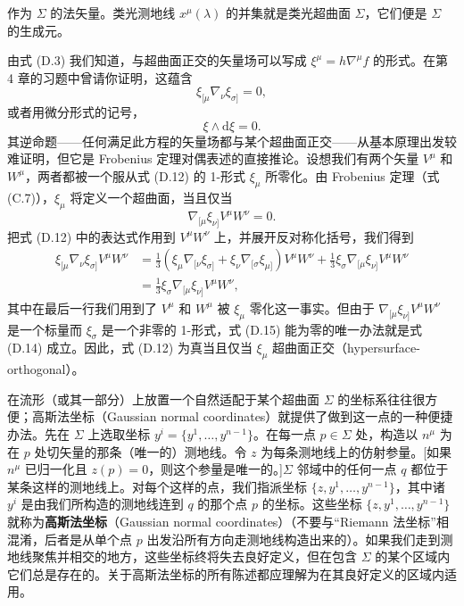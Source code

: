 作为 $\Sigma$ 的法矢量。类光测地线 $x^\mu(\lambda)$ 的并集就是类光超曲面 $\Sigma$，它们便是 $\Sigma$ 的生成元。

由式 (D.3) 我们知道，与超曲面正交的矢量场可以写成 $\xi^\mu = h \nabla^\mu f$ 的形式。在第 4 章的习题中曾请你证明，这蕴含
\begin{equation*}
\xi_{[\mu} \nabla_\nu \xi_{\sigma]} = 0,
\tag{D.12}
\end{equation*}
或者用微分形式的记号，
\begin{equation*}
\xi \wedge \mathrm{d}\xi = 0.
\tag{D.13}
\end{equation*}
其逆命题——任何满足此方程的矢量场都与某个超曲面正交——从基本原理出发较难证明，但它是 Frobenius 定理对偶表述的直接推论。设想我们有两个矢量 $V^\mu$ 和 $W^\mu$，两者都被一个服从式 (D.12) 的 1-形式 $\xi_\mu$ 所零化。由 Frobenius 定理（式 (C.7)），$\xi_\mu$ 将定义一个超曲面，当且仅当
\begin{equation*}
\nabla_{[\mu} \xi_{\nu]} V^\mu W^\nu = 0.
\tag{D.14}
\end{equation*}
把式 (D.12) 中的表达式作用到 $V^\mu W^\nu$ 上，并展开反对称化括号，我们得到
\begin{align*}
\xi_{[\mu} \nabla_\nu \xi_{\sigma]} V^\mu W^\nu
&= \tfrac{1}{3} \left( \xi_\mu \nabla_{[\nu} \xi_{\sigma]} + \xi_\nu \nabla_{[\sigma} \xi_{\mu]} \right) V^\mu W^\nu + \tfrac{1}{3} \xi_\sigma \nabla_{[\mu} \xi_{\nu]} V^\mu W^\nu \\
&= \tfrac{1}{3} \xi_\sigma \nabla_{[\mu} \xi_{\nu]} V^\mu W^\nu,
\tag{D.15}
\end{align*}
其中在最后一行我们用到了 $V^\mu$ 和 $W^\mu$ 被 $\xi_\mu$ 零化这一事实。但由于 $\nabla_{[\mu} \xi_{\nu]} V^\mu W^\nu$ 是一个标量而 $\xi_\sigma$ 是一个非零的 1-形式，式 (D.15) 能为零的唯一办法就是式 (D.14) 成立。因此，式 (D.12) 为真当且仅当 $\xi_\mu$ 超曲面正交（hypersurface-orthogonal）。

在流形（或其一部分）上放置一个自然适配于某个超曲面 $\Sigma$ 的坐标系往往很方便；高斯法坐标（Gaussian normal coordinates）就提供了做到这一点的一种便捷办法。先在 $\Sigma$ 上选取坐标 $y^i = \{y^1, \ldots, y^{n-1}\}$。在每一点 $p \in \Sigma$ 处，构造以 $n^\mu$ 为在 $p$ 处切矢量的那条（唯一的）测地线。令 $z$ 为每条测地线上的仿射参量。[如果 $n^\mu$ 已归一化且 $z(p) = 0$，则这个参量是唯一的。]$\Sigma$ 邻域中的任何一点 $q$ 都位于某条这样的测地线上。对每个这样的点，我们指派坐标 $\{z, y^1, \ldots, y^{n-1}\}$，其中诸 $y^i$ 是由我们所构造的测地线连到 $q$ 的那个点 $p$ 的坐标。这些坐标 $\{z, y^1, \ldots, y^{n-1}\}$ 就称为\textbf{高斯法坐标}（Gaussian normal coordinates）（不要与“Riemann 法坐标”相混淆，后者是从单个点 $p$ 出发沿所有方向走测地线构造出来的）。如果我们走到测地线聚焦并相交的地方，这些坐标终将失去良好定义，但在包含 $\Sigma$ 的某个区域内它们总是存在的。关于高斯法坐标的所有陈述都应理解为在其良好定义的区域内适用。

